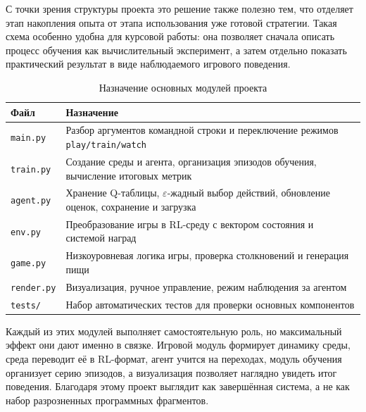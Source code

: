 С точки зрения структуры проекта это решение также полезно тем, что отделяет этап накопления опыта от этапа использования уже готовой стратегии. Такая схема особенно удобна для курсовой работы: она позволяет сначала описать процесс обучения как вычислительный эксперимент, а затем отдельно показать практический результат в виде наблюдаемого игрового поведения.

\begin{table}[H]
    \centering
    \caption{Назначение основных модулей проекта}
    \begin{tabularx}{\textwidth}{>{\raggedright\arraybackslash}p{} X}
        \toprule
        Файл & Назначение \\
        \midrule
        \texttt{main.py} & Разбор аргументов командной строки и переключение режимов \texttt{play/train/watch} \\
        \texttt{train.py} & Создание среды и агента, организация эпизодов обучения, вычисление итоговых метрик \\
        \texttt{agent.py} & Хранение Q-таблицы, $\varepsilon$-жадный выбор действий, обновление оценок, сохранение и загрузка \\
        \texttt{env.py} & Преобразование игры в RL-среду с вектором состояния и системой наград \\
        \texttt{game.py} & Низкоуровневая логика игры, проверка столкновений и генерация пищи \\
        \texttt{render.py} & Визуализация, ручное управление, режим наблюдения за агентом \\
        \texttt{tests/} & Набор автоматических тестов для проверки основных компонентов \\
        \bottomrule
    \end{tabularx}
\end{table}

Каждый из этих модулей выполняет самостоятельную роль, но максимальный эффект они дают именно в связке. Игровой модуль формирует динамику среды, среда переводит её в RL-формат, агент учится на переходах, модуль обучения организует серию эпизодов, а визуализация позволяет наглядно увидеть итог поведения. Благодаря этому проект выглядит как завершённая система, а не как набор разрозненных программных фрагментов.
